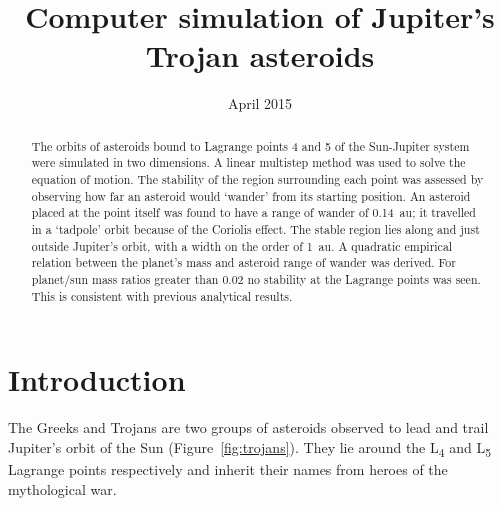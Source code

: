 \documentclass[a4paper]{article}
\begin{document}

  \author{}
  \title{Computer simulation of Jupiter's Trojan asteroids}
  \date{April 2015}
  \maketitle

  \begin{abstract}
   
    The orbits of asteroids bound to Lagrange points 4 and 5 of the Sun-Jupiter
    system were simulated in two dimensions. A linear multistep method was used
    to solve the equation of motion. The stability of the region surrounding
    each point was assessed by observing how far an asteroid would `wander'
    from its starting position. An asteroid placed at the point itself was
    found to have a range of wander of \SI{0.14}{\astronomicalunit}; it
    travelled in a `tadpole' orbit because of the Coriolis effect. The stable
    region lies along and just outside Jupiter's orbit, with a width on the
    order of \SI{1}{\astronomicalunit}. A quadratic empirical relation between
    the planet's mass and asteroid range of wander was derived. For planet/sun
    mass ratios greater than 0.02 no stability at the Lagrange points was seen.
    This is consistent with previous analytical results.

  \end{abstract}

  \section{Introduction}

    The Greeks and Trojans are two groups of asteroids observed to lead and
    trail Jupiter's orbit of the Sun (Figure~\ref{fig:trojans}). They lie
    around the L\textsubscript{4} and L\textsubscript{5} Lagrange points
    respectively and inherit their names from heroes of the mythological war.
\end{document}
